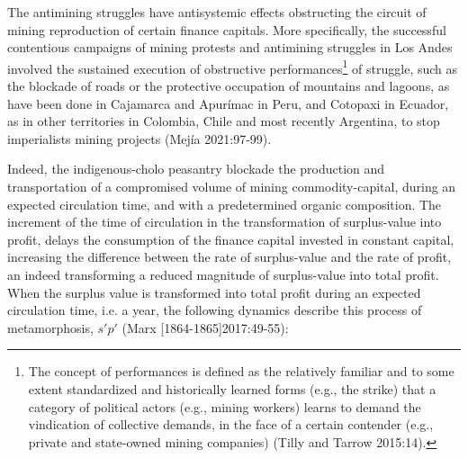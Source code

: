 \documentclass[]{interact}
\theoremstyle{plain}%
\theoremstyle{definition}
\theoremstyle{remark}
\begin{document}
The antimining struggles have antisystemic effects obstructing the circuit of mining reproduction of certain finance capitals. More specifically, the successful contentious campaigns of mining protests and antimining struggles in Los Andes involved the sustained execution of obstructive performances\footnote{The concept of performances is defined as the relatively familiar and to some extent standardized and historically learned forms (e.g., the strike) that a category of political actors (e.g., mining workers) learns to demand the vindication of collective demands, in the face of a certain contender (e.g., private and state-owned mining companies) (Tilly and Tarrow 2015:14).} of struggle, such as the blockade of roads or the protective occupation of mountains and lagoons, as have been done in Cajamarca and Apurímac in Peru, and  Cotopaxi in Ecuador, as in other territories in  Colombia, Chile and most recently Argentina, to stop imperialists mining projects (Mejía 2021:97-99).

Indeed, the indigenous-cholo peasantry blockade the production and transportation of a compromised volume of mining commodity-capital, during an expected circulation time, and with a predetermined organic composition. The increment of the time of circulation in the transformation of surplus-value into profit, delays the consumption of the finance capital invested in constant capital, increasing the difference between the rate of surplus-value and the rate of profit, an indeed transforming a reduced magnitude of surplus-value into total profit. 
When the surplus value is transformed into total profit during an expected circulation time, i.e. a year, the following dynamics describe this process of metamorphosis, 
\(s'\)\(p'\) (Marx [1864-1865]2017:49-55):
\end{document}
